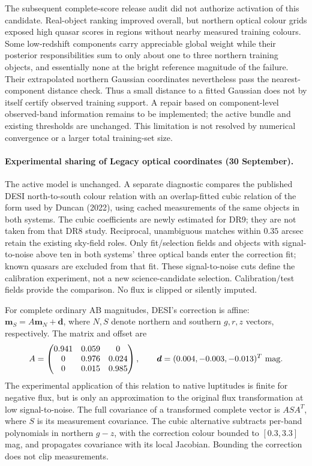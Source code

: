 \documentclass[11pt,a4paper]{article}
\begin{document}
The subsequent complete-score release audit did not authorize activation of
this candidate. Real-object ranking improved overall, but northern optical
colour grids exposed high quasar scores in regions without nearby measured
training colours. Some low-redshift components carry appreciable global weight
while their posterior responsibilities sum to only about one to three northern
training objects, and essentially none at the bright reference magnitude of
the failure. Their extrapolated northern Gaussian coordinates nevertheless
pass the nearest-component distance check. Thus a small distance to a fitted
Gaussian does not by itself certify observed training support. A repair based
on component-level observed-band information remains to be implemented; the
active bundle and existing thresholds are unchanged. This limitation is not
resolved by numerical convergence or a larger total training-set size.

\paragraph{Experimental sharing of Legacy optical coordinates (30 September).}
The active model is unchanged. A separate diagnostic compares the published
DESI north-to-south colour relation with an overlap-fitted cubic relation of
the form used by Duncan (2022), using cached measurements of the same objects
in both systems. The cubic coefficients are newly estimated for DR9; they are
not taken from that DR8 study. Reciprocal, unambiguous matches within
$0.35$ arcsec retain the existing sky-field roles. Only fit/selection fields
and objects with signal-to-noise above ten in both systems' three optical
bands enter the correction fit; known quasars are excluded from that fit.
These signal-to-noise cuts define the calibration experiment, not a new
science-candidate selection. Calibration/test fields provide the comparison.
No flux is clipped or silently imputed.

For complete ordinary AB magnitudes, DESI's correction is affine:
$\boldsymbol m_S=A\boldsymbol m_N+\boldsymbol d$, where $N,S$ denote
northern and southern $g,r,z$ vectors, respectively. The matrix and offset are
\[
A=\begin{pmatrix}0.941&0.059&0\\0&0.976&0.024\\0&0.015&0.985\end{pmatrix},
\qquad \boldsymbol d=(0.004,-0.003,-0.013)^T\ {\rm mag}.
\]
The experimental application of this relation to native luptitudes is finite
for negative flux, but is only an approximation to the original flux
transformation at low signal-to-noise. The full covariance of a transformed
complete vector is $A S A^T$, where $S$ is its measurement covariance.
The cubic alternative subtracts per-band polynomials in northern $g-z$, with
the correction colour bounded to $[0.3,3.3]$ mag, and propagates covariance
with its local Jacobian. Bounding the correction does not clip measurements.
\end{document}
